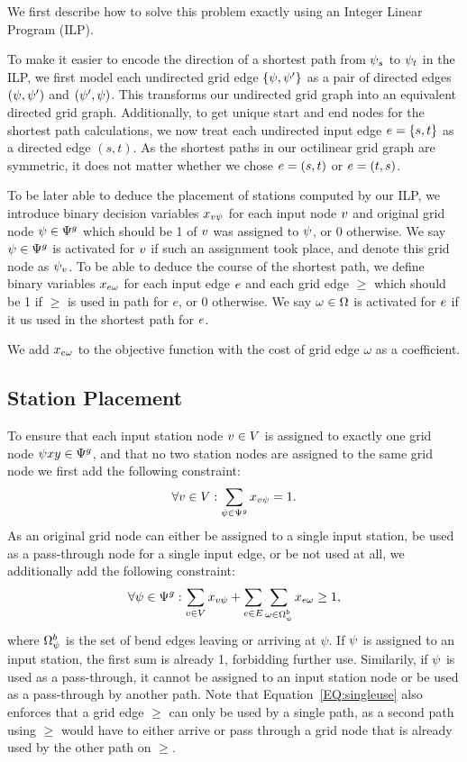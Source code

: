 \documentclass{sig-alternate-sigmod09}
\begin{document}
We first describe how to solve this problem exactly using an Integer Linear Program (ILP).

To make it easier to encode the direction of a shortest path from $\psi_s$ to $\psi_t$ in the ILP, we first model each undirected grid edge $\{\psi, \psi'\}$ as a pair of directed edges $(\psi, \psi')$ and $(\psi', \psi)$.
This transforms our undirected grid graph into an equivalent directed grid graph.
Additionally, to get unique start and end nodes for the shortest path calculations, we now treat each undirected input edge $e = \{s, t\}$ as a directed edge $(s, t)$.
As the shortest paths in our octilinear grid graph are symmetric, it does not matter whether we chose $e = (s, t)$ or $e = (t, s)$.

To be later able to deduce the placement of stations computed by our ILP, we introduce binary decision variables $x_{v\psi}$ for each input node $v$ and original grid node $\psi \in \Psi^g$ which should be 1 of $v$ was assigned to $\psi$, or 0 otherwise.
We say $\psi \in \Psi^g$ is activated for $v$ if such an assignment took place, and denote this grid node as $\psi_v$.
To be able to deduce the course of the shortest path, we define binary variables $x_{e\omega}$ for each input edge $e$ and each grid edge $\ge$ which should be 1 if $\ge$ is used in path for $e$, or 0 otherwise.
We say $\omega \in \Omega$ is activated for $e$ if it us used in the shortest path for $e$.

We add $x_{e\omega}$ to the objective function with the cost of grid edge $\omega$ as a coefficient.

\subsection{Station Placement}

To ensure that each input station node $v \in V$ is assigned to exactly one grid node $\psi{x}{y} \in \Psi^g$, and that no two station nodes are assigned to the same grid node we first add the following constraint:
%
\begin{equation}
  \forall v \in V: \sum_{\psi \in \Psi^g} x_{v\psi} = 1. \label{EQ:onegvperiv}
\end{equation}
%
As an original grid node can either be assigned to a single input station, be used as a pass-through node for a single input edge, or be not used at all, we additionally add the following constraint:
%
\begin{equation}
  \forall \psi \in \Psi^g: \sum_{v \in V} x_{v\psi} + \sum_{e \in E} \sum_{\omega \in \Omega^b_\psi} x_{e\omega} \geq 1, \label{EQ:singleuse}
\end{equation}
%
where $\Omega^b_\psi$ is the set of bend edges leaving or arriving at $\psi$. 
If $\psi$ is assigned to an input station, the first sum is already 1, forbidding further use.
Similarily, if $\psi$ is used as a pass-through, it cannot be assigned to an input station node or be used as a pass-through by another path.
Note that Equation~\ref{EQ:singleuse} also enforces that a grid edge $\ge$ can only be used by a single path, as a second path using $\ge$ would have to either arrive or pass through a grid node that is already used by the other path on $\ge$.
\end{document}
